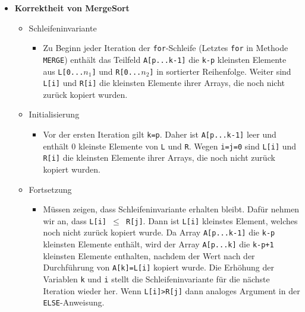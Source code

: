 \begin{itemize}
        \item \textbf{Korrektheit von MergeSort}
            \begin{itemize}
                \item Schleifeninvariante
                    \begin{itemize}
                        \item[]
                            Zu Beginn jeder Iteration der \texttt{for}-Schleife (Letztes \texttt{for} in Methode \texttt{MERGE}) enthält
                            das Teilfeld \texttt{A[p...k-1]} die \texttt{k-p} kleinsten Elemente aus \texttt{L[0...$n_1$]} und \texttt{R[0...$n_2$]}
                            in sortierter Reihenfolge. Weiter sind \texttt{L[i]} und \texttt{R[i]} die kleinsten Elemente ihrer Arrays, die noch nicht
                            zurück kopiert wurden.
                    \end{itemize}
                \item Initialisierung
                    \begin{itemize}
                        \item[]
                            Vor der ersten Iteration gilt \texttt{k=p}. Daher ist \texttt{A[p...k-1]} leer und enthält 0 kleinste Elemente von 
                            \texttt{L} und \texttt{R}. Wegen \texttt{i=j=0} sind \texttt{L[i]} und \texttt{R[i]} die kleinsten Elemente ihrer 
                            Arrays, die noch nicht zurück kopiert wurden.
                    \end{itemize}
                \item Fortsetzung
                    \begin{itemize}
                        \item[]
                            Müssen zeigen, dass Schleifeninvariante erhalten bleibt. Dafür nehmen wir an, dass \texttt{L[i] $\leq$ R[j]}. Dann ist 
                            \texttt{L[i]} kleinstes Element, welches noch nicht zurück kopiert wurde. Da Array \texttt{A[p...k-1]} die \texttt{k-p}
                            kleinsten Elemente enthält, wird der Array \texttt{A[p...k]} die \texttt{k-p+1} kleinsten Elemente enthalten, nachdem 
                            der Wert nach der Durchführung von \texttt{A[k]=L[i]} kopiert wurde. Die Erhöhung der Variablen \texttt{k} und \texttt{i}
                            stellt die Schleifeninvariante für die nächste Iteration wieder her. Wenn \texttt{L[i]>R[j]} dann analoges Argument 
                            in der \texttt{ELSE}-Anweisung. 

\end{itemize}
\end{itemize}
\end{itemize}
